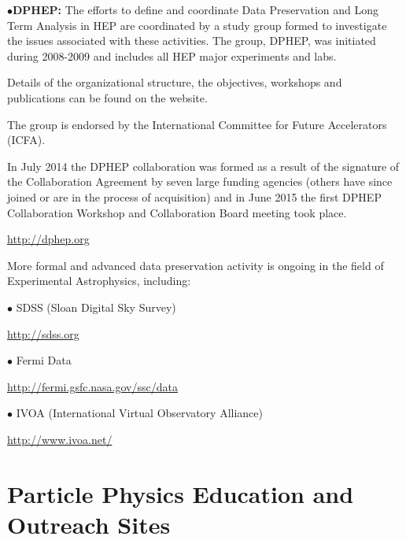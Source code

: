 \medskip

\item{$\bullet$}{\bf DPHEP:} 
The efforts to define and coordinate Data Preservation and Long Term Analysis in HEP are coordinated by a study group formed to investigate the issues associated with these activities. The group, DPHEP, was initiated during 2008-2009 and includes all HEP major experiments and labs.

\item{}Details of the organizational structure, the objectives, workshops and publications can be found on the website.

\item{}The group is endorsed by the International Committee for Future Accelerators (ICFA).

\item{}In July 2014 the DPHEP collaboration was formed as a result of the signature of the Collaboration Agreement by seven large funding agencies (others have since joined or are in the process of acquisition) and in June 2015 the first DPHEP Collaboration Workshop and Collaboration Board meeting took place.

	\item{}\qquad\url{http://dphep.org}

\medskip
\medskip


\medskip

More formal and advanced data preservation activity is ongoing in the field of Experimental Astrophysics, including:
\item{$\bullet$}
SDSS (Sloan Digital Sky Survey) \item{}\qquad\url{http://sdss.org}
\item{$\bullet$}
Fermi Data\item{}\qquad\url{http://fermi.gsfc.nasa.gov/ssc/data} 
\medskip

\item{$\bullet$}
IVOA (International Virtual Observatory Alliance) \item{}\qquad\url{http://www.ivoa.net/}
\medskip


\section{Particle Physics Education and Outreach Sites}  %

\medskip



